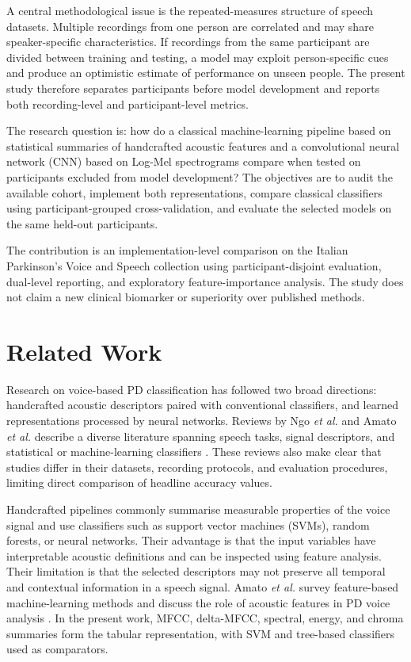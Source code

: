 \documentclass[conference]{IEEEtran}
\begin{document}
A central methodological issue is the repeated-measures structure of speech datasets. Multiple recordings from one person are correlated and may share speaker-specific characteristics. If recordings from the same participant are divided between training and testing, a model may exploit person-specific cues and produce an optimistic estimate of performance on unseen people. The present study therefore separates participants before model development and reports both recording-level and participant-level metrics.

The research question is: how do a classical machine-learning pipeline based on statistical summaries of handcrafted acoustic features and a convolutional neural network (CNN) based on Log-Mel spectrograms compare when tested on participants excluded from model development? The objectives are to audit the available cohort, implement both representations, compare classical classifiers using participant-grouped cross-validation, and evaluate the selected models on the same held-out participants.

The contribution is an implementation-level comparison on the Italian Parkinson's Voice and Speech collection using participant-disjoint evaluation, dual-level reporting, and exploratory feature-importance analysis. The study does not claim a new clinical biomarker or superiority over published methods.

\section{Related Work}
Research on voice-based PD classification has followed two broad directions: handcrafted acoustic descriptors paired with conventional classifiers, and learned representations processed by neural networks. Reviews by Ngo \emph{et al.} and Amato \emph{et al.} describe a diverse literature spanning speech tasks, signal descriptors, and statistical or machine-learning classifiers \cite{ngo2022,amato2023}. These reviews also make clear that studies differ in their datasets, recording protocols, and evaluation procedures, limiting direct comparison of headline accuracy values.

Handcrafted pipelines commonly summarise measurable properties of the voice signal and use classifiers such as support vector machines (SVMs), random forests, or neural networks. Their advantage is that the input variables have interpretable acoustic definitions and can be inspected using feature analysis. Their limitation is that the selected descriptors may not preserve all temporal and contextual information in a speech signal. Amato \emph{et al.} survey feature-based machine-learning methods and discuss the role of acoustic features in PD voice analysis \cite{amato2023}. In the present work, MFCC, delta-MFCC, spectral, energy, and chroma summaries form the tabular representation, with SVM and tree-based classifiers used as comparators.
\end{document}
